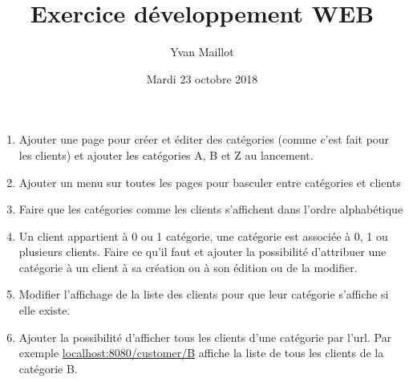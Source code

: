 \documentclass[a4paper,10pt]{article}
\title{Exercice développement WEB}
\author{Yvan Maillot}
\date{Mardi 23 octobre 2018}
\begin{document}
\maketitle

\begin{enumerate}
 \item Ajouter une page pour créer et éditer des catégories (comme c'est fait pour les clients) et ajouter les catégories A, B et Z au lancement.
 \item Ajouter un menu sur toutes les pages pour basculer entre catégories et clients
 \item Faire que les catégories comme les clients s'affichent dans l'ordre alphabétique
 \item Un client appartient à 0 ou 1 catégorie, une catégorie est associée à 0, 1 ou plusieurs clients. Faire ce qu'il faut et ajouter la possibilité d'attribuer une catégorie à un client à sa création ou à son édition ou de la modifier.
 \item Modifier l'affichage de la liste des clients pour que leur catégorie s'affiche si elle existe.
 \item Ajouter la possibilité d'afficher tous les clients d'une catégorie par l'url. Par exemple \url{localhost:8080/customer/B} affiche la liste de tous les clients de la catégorie B.
\end{enumerate}
\end{document}

